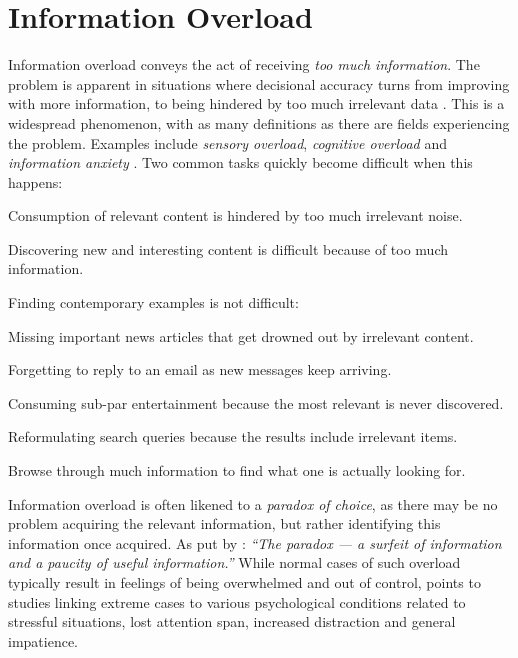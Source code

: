 \section{Information Overload}

Information overload conveys the act of receiving \emph{too much information}. 
The problem is apparent in situations where decisional accuracy turns from improving with more information, 
to being hindered by too much irrelevant data \cite[p.13]{Bjorkoy2010d}. 
This is a widespread phenomenon, with as many definitions as there are fields experiencing the problem. 
Examples include \emph{sensory overload}, \emph{cognitive overload} and \emph{information anxiety} \cite[p.2]{Eppler2004}.
Two common tasks quickly become difficult when this happens:

\begin{enumerate*}
  \item Consumption of relevant content is hindered by too much irrelevant noise.
  \item Discovering new and interesting content is difficult because of too much information.
\end{enumerate*}

\noindent
Finding contemporary examples is not difficult:

\begin{itemize*}
  \item Missing important news articles that get drowned out by irrelevant content.
  \item Forgetting to reply to an email as new messages keep arriving.
  \item Consuming sub-par entertainment because the most relevant is never discovered.
  \item Reformulating search queries because the results include irrelevant items.
  \item Browse through much information to find what one is actually looking for.
\end{itemize*}

Information overload is often likened to a \emph{paradox of choice}, as there may be no problem acquiring the relevant information, 
but rather identifying this information once acquired. As put by \cite[p.6]{Edmunds2000}: 
\emph{``The paradox --- a surfeit of information and a paucity of useful information.''}
While normal cases of such overload typically result in feelings of being overwhelmed and out of control, 
\citet[p.5]{Bawden2008} points to studies linking extreme cases to various psychological conditions 
related to stressful situations, lost attention span, increased distraction and general impatience.

